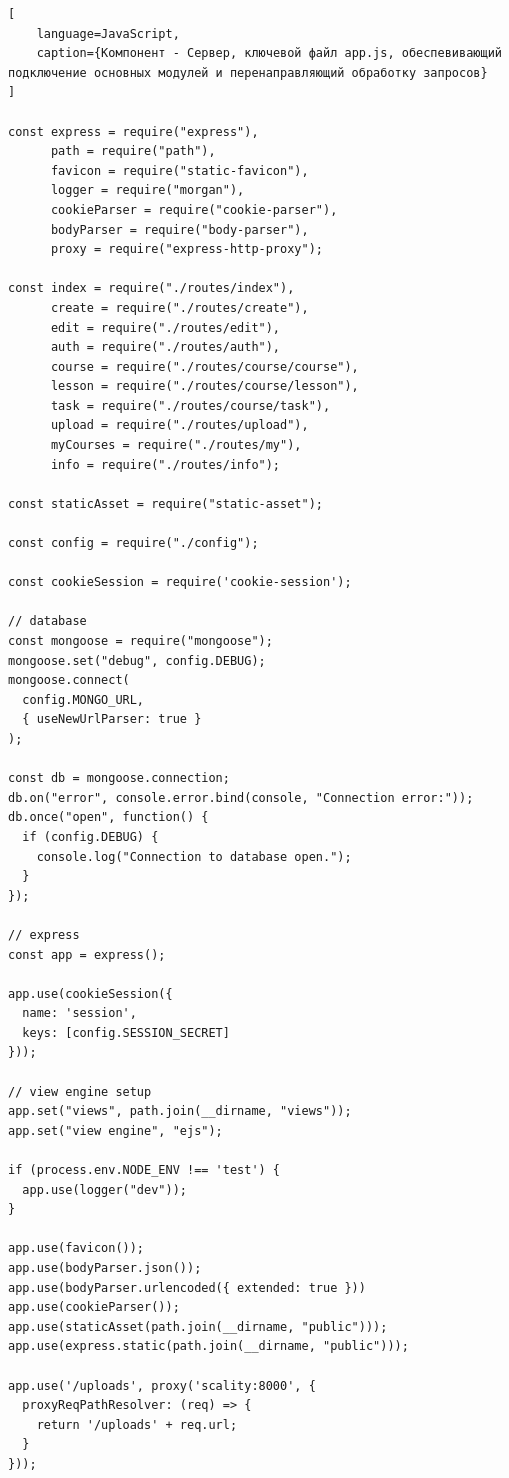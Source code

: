 \documentclass[%
  a5paper,
  subf,
  href,
  master,
  dotsinheaders 
]{csse-fcs}
\begin{document}
\begin{lstlisting}[
    language=JavaScript,
    caption={Компонент - Сервер, ключевой файл app.js, обеспевивающий подключение основных модулей и перенаправляющий обработку запросов}
]

const express = require("express"),
      path = require("path"),
      favicon = require("static-favicon"),
      logger = require("morgan"),
      cookieParser = require("cookie-parser"),
      bodyParser = require("body-parser"),
      proxy = require("express-http-proxy");

const index = require("./routes/index"),
      create = require("./routes/create"),
      edit = require("./routes/edit"),
      auth = require("./routes/auth"),
      course = require("./routes/course/course"),
      lesson = require("./routes/course/lesson"),
      task = require("./routes/course/task"),
      upload = require("./routes/upload"),
      myCourses = require("./routes/my"),
      info = require("./routes/info");

const staticAsset = require("static-asset");

const config = require("./config");

const cookieSession = require('cookie-session');

// database
const mongoose = require("mongoose");
mongoose.set("debug", config.DEBUG);
mongoose.connect(
  config.MONGO_URL,
  { useNewUrlParser: true }
);

const db = mongoose.connection;
db.on("error", console.error.bind(console, "Connection error:"));
db.once("open", function() {
  if (config.DEBUG) {
    console.log("Connection to database open.");
  }
});

// express
const app = express();

app.use(cookieSession({
  name: 'session',
  keys: [config.SESSION_SECRET]
}));

// view engine setup
app.set("views", path.join(__dirname, "views"));
app.set("view engine", "ejs");

if (process.env.NODE_ENV !== 'test') {
  app.use(logger("dev"));
}

app.use(favicon());
app.use(bodyParser.json());
app.use(bodyParser.urlencoded({ extended: true }))
app.use(cookieParser());
app.use(staticAsset(path.join(__dirname, "public")));
app.use(express.static(path.join(__dirname, "public")));

app.use('/uploads', proxy('scality:8000', {
  proxyReqPathResolver: (req) => {
    return '/uploads' + req.url;
  }
}));


\end{lstlisting}
\end{document}
